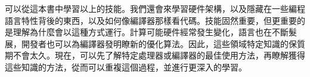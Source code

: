 可以從這本書中學習以上的技能。我們還會來學習硬件架構，以及隱藏在一些編程語言特性背後的東西，以及如何像編譯器那樣看代碼。技能固然重要，但更重要的是理解為什麼會以這種方式運行。計算可能硬件經常發生變化，語言也在不斷髮展，開發者也可以為編譯器發明瞭新的優化算法。因此，這些領域特定知識的保質期不會太久。現在，可以先了解特定處理器或編譯器的最佳使用方法，再瞭解獲得這些知識的方法，從而可以重複這個過程，並進行更深入的學習。
































